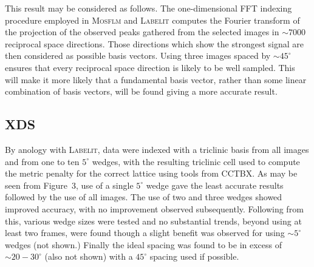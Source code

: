 \documentclass[preprint,pdf]{iucr}
\begin{document}
This result may be considered as follows. The one-dimensional FFT
indexing procedure employed in \textsc{Mosflm} and \textsc{Labelit} computes the
Fourier transform of the projection of the observed peaks gathered
from the selected images in $\sim
7000$ reciprocal space directions. Those directions which show the
strongest signal are then considered as possible basis vectors. Using
three images spaced by $\sim 45^{\circ}$ ensures that every reciprocal
space direction is likely to be well sampled. This will make it more likely
that a fundamental basis vector, rather than some linear combination
of basis vectors, will be found giving a more accurate result.

\subsection{XDS}

By anology with \textsc{Labelit}, data were indexed with a triclinic basis
from all images and from one to ten $5^{\circ}$ wedges, with the
resulting triclinic cell used to
compute the metric penalty for the correct lattice
using tools from CCTBX. As may be seen
from Figure~3,
use of a single $5^{\circ}$ wedge gave the least accurate
results followed by the use of all images. The use of two and three
wedges showed improved accuracy, with no improvement observed
subsequently. Following from this, various wedge sizes were tested and
no substantial trends, beyond using at least two frames, were found
though a slight benefit was observed for using $\sim 5^{\circ}$ wedges
(not shown.) Finally the ideal spacing was found to be 
in excess of $\sim 20 - 30^{\circ}$ (also not shown) with a
$45^{\circ}$ spacing used if possible.  
\end{document}
